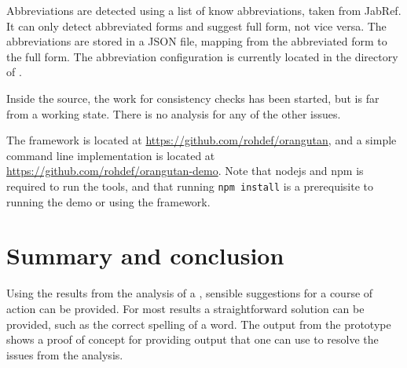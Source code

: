 Abbreviations are detected using a list of know abbreviations, taken
from JabRef.  It can only detect abbreviated forms and suggest full
form, not vice versa.  The abbreviations are stored in a JSON file,
mapping from the abbreviated form to the full form. The abbreviation
configuration is currently located in the directory of {\orangutan}.

Inside the {\orangutan} source, the work for consistency checks has
been started, but is far from a working state.  There is no analysis
for any of the other issues.

The {\orangutan} framework is located at
\url{https://github.com/rohdef/orangutan}, and a simple command line
implementation is located at
\url{https://github.com/rohdef/orangutan-demo}.  Note that nodejs and
npm is required to run the tools, and that running \texttt{npm
  install} is a prerequisite to running the demo or using the
framework.


\section{Summary and conclusion}

Using the results from the analysis of a , sensible
suggestions for a course of action can be provided.  For most results
a straightforward solution can be provided, such as the correct
spelling of a word.  The output from the prototype {\orangutan} shows
a proof of concept for providing output that one can use to resolve
the issues from the analysis.
